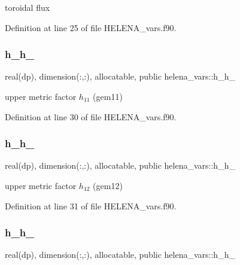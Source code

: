 toroidal flux 



Definition at line 25 of file H\+E\+L\+E\+N\+A\+\_\+vars.\+f90.

\mbox{\label{namespacehelena__vars_acb51f1141d5faeeef88bbf7fc6bab55f}} 
\subsubsection{\texorpdfstring{h\+\_\+h\+\_}{h\_h\_11}}
{\footnotesize\ttfamily real(dp), dimension(\+:,\+:), allocatable, public helena\+\_\+vars\+::h\+\_\+h\+\_}



upper metric factor $h_{11}$ ({\ttfamily gem11}) 



Definition at line 30 of file H\+E\+L\+E\+N\+A\+\_\+vars.\+f90.

\mbox{\label{namespacehelena__vars_ab3fee13ba0983e009a160324044cb708}} 
\subsubsection{\texorpdfstring{h\+\_\+h\+\_}{h\_h\_12}}
{\footnotesize\ttfamily real(dp), dimension(\+:,\+:), allocatable, public helena\+\_\+vars\+::h\+\_\+h\+\_}



upper metric factor $h_{12}$ ({\ttfamily gem12}) 



Definition at line 31 of file H\+E\+L\+E\+N\+A\+\_\+vars.\+f90.

\mbox{\label{namespacehelena__vars_a1456485c35bfb60ed2d7f93d611a7b5d}} 
\subsubsection{\texorpdfstring{h\+\_\+h\+\_}{h\_h\_33}}
{\footnotesize\ttfamily real(dp), dimension(\+:,\+:), allocatable, public helena\+\_\+vars\+::h\+\_\+h\+\_}




